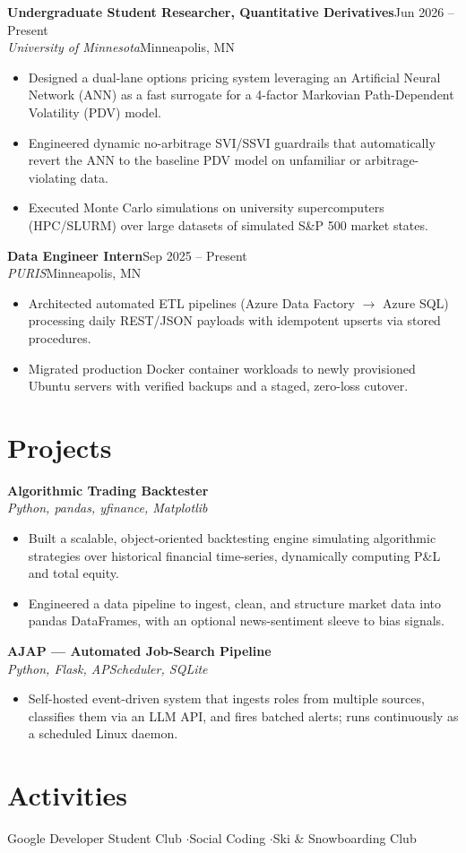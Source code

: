 \documentclass[letterpaper,10.5pt]{article}
\newcommand{\entry}[4]{\textbf{#1}\hfill{\small #2}\\\textit{\small #3}\hfill{\small #4}\par\vspace{1pt}}
\begin{document}
\entry{Undergraduate Student Researcher, Quantitative Derivatives}{Jun 2026 -- Present}{University of Minnesota}{Minneapolis, MN}
\begin{itemize}
  \item Designed a dual-lane options pricing system leveraging an Artificial Neural Network (ANN) as a fast surrogate for a 4-factor Markovian Path-Dependent Volatility (PDV) model.
  \item Engineered dynamic no-arbitrage SVI/SSVI guardrails that automatically revert the ANN to the baseline PDV model on unfamiliar or arbitrage-violating data.
  \item Executed Monte Carlo simulations on university supercomputers (HPC/SLURM) over large datasets of simulated S\&P 500 market states.
\end{itemize}

\entry{Data Engineer Intern}{Sep 2025 -- Present}{PURIS}{Minneapolis, MN}
\begin{itemize}
  \item Architected automated ETL pipelines (Azure Data Factory $\rightarrow$ Azure SQL) processing daily REST/JSON payloads with idempotent upserts via stored procedures.
  \item Migrated production Docker container workloads to newly provisioned Ubuntu servers with verified backups and a staged, zero-loss cutover.
\end{itemize}

\section{Projects}
\entry{Algorithmic Trading Backtester}{}{Python, pandas, yfinance, Matplotlib}{}
\begin{itemize}
  \item Built a scalable, object-oriented backtesting engine simulating algorithmic strategies over historical financial time-series, dynamically computing P\&L and total equity.
  \item Engineered a data pipeline to ingest, clean, and structure market data into pandas DataFrames, with an optional news-sentiment sleeve to bias signals.
\end{itemize}

\entry{AJAP --- Automated Job-Search Pipeline}{}{Python, Flask, APScheduler, SQLite}{}
\begin{itemize}
  \item Self-hosted event-driven system that ingests roles from multiple sources, classifies them via an LLM API, and fires batched alerts; runs continuously as a scheduled Linux daemon.
\end{itemize}

\section{Activities}
{\small Google Developer Student Club \quad$\cdot$\quad Social Coding \quad$\cdot$\quad Ski \& Snowboarding Club}
\end{document}
